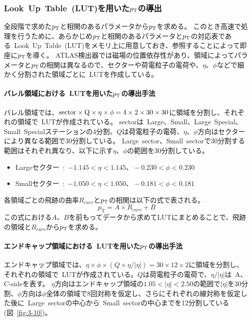 \subsubsection{Look~Up~Table~(LUT)を用いた$p_\mathrm{T}$の導出}
全段階で求めた$p_\mathrm{T}$と相関のあるパラメータから$p_\mathrm{T}$を求める。
このとき高速で処理を行うために、あらかじめ$p_\mathrm{T}$と相関のあるパラメータと$p_\mathrm{T}$の対応表である~Look~Up~Table~(LUT)をメモリ上に用意しておき、参照することによって即座に$p_\mathrm{T}$を導く。
ATLAS検出器では磁場の位置依存性があり、領域によってパラメータと$p_\mathrm{T}$の相関は異なるので、セクターや荷電粒子の電荷や、$\eta$、$\phi$などで細かく分割された領域ごとに~LUTを作成している。

\paragraph{バレル領域における~LUTを用いた$p_\mathrm{T}$の導出手法}
バレル領域では、$\rm{sector}\times Q \times \eta \times \phi = 4\times2\times30\times30$に領域を分割し、それぞれの領域で~LUTが作成されている。
sectorは~Large、Small、Large~Special、Small~Specialステーションの4分割、$Q$は荷電粒子の電荷、$\eta$、$\phi$方向はセクターにより異なる範囲で30分割している。
Large~sector、Small~sectorで30分割する範囲はそれぞれ異なり、以下に示す$\eta$、$\phi$の範囲を30分割している。
\begin{itemize}
    \item Largeセクター~:~$-1.145<\eta<1.145、-0.230<\phi<0.230$
    \item Smallセクター~:~$-1.050<\eta<1.050、-0.181<\phi<0.181$
\end{itemize}


各領域ごとの飛跡の曲率$R_{curv}$と$p_\mathrm{T}$の相関は以下の式で表される。
\begin{equation}
    p_{\mathrm{T}}=A \times R_{curv}+B
\end{equation}
この式における$A$、$B$を前もってデータから求めてLUTにまとめることで、飛跡の領域と$R_{curv}$から$p_\mathrm{T}$を求める。


\paragraph{エンドキャップ領域における~LUTを用いた$p_\mathrm{T}$の導出手法}
エンドキャップ領域では、$\eta \times \phi \times (Q \times \eta/|\eta|)= 30\times12\times2$に領域を分割し、それぞれの領域で~LUTが作成されている。$Q$は荷電粒子の電荷で、$\eta/|\eta|$は~A、C-sideを表す。
$\eta$方向はエンドキャップ領域の$1.05<|\eta|<2.50$の範囲で$|\eta|$を30分割、$\phi$方向は$\phi$全体の領域で8回対称を仮定し、さらにそれぞれの線対称を仮定した後に~Large~sectorの中心から~Small~sectorの中心までを12分割している(図~\ref{fig:3-10})。

